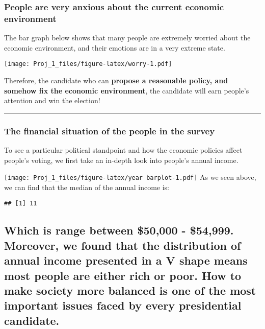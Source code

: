 \documentclass[
]{article}
\begin{document}
\hypertarget{people-are-very-anxious-about-the-current-economic-environment}{%
\subsubsection{People are very anxious about the current economic
environment}\label{people-are-very-anxious-about-the-current-economic-environment}}

The bar graph below shows that many people are extremely worried about
the economic environment, and their emotions are in a very extreme
state.

\texttt{[image: Proj\_1\_files/figure-latex/worry-1.pdf]}

Therefore, the candidate who can \textbf{propose a reasonable policy,
and somehow fix the economic environment}, the candidate will earn
people's attention and win the election!

\begin{center}\rule{0.5\linewidth}{0.5pt}\end{center}

\hypertarget{the-financial-situation-of-the-people-in-the-survey}{%
\subsubsection{The financial situation of the people in the
survey}\label{the-financial-situation-of-the-people-in-the-survey}}

To see a particular political standpoint and how the economic policies
affect people's voting, we first take an in-depth look into people's
annual income.

\texttt{[image: Proj\_1\_files/figure-latex/year barplot-1.pdf]} As we
seen above, we can find that the median of the annual income is:

\begin{verbatim}
## [1] 11
\end{verbatim}

\hypertarget{which-is-range-between-50000---54999.-moreover-we-found-that-the-distribution-of-annual-income-presented-in-a-v-shape-means-most-people-are-either-rich-or-poor.-how-to-make-society-more-balanced-is-one-of-the-most-important-issues-faced-by-every-presidential-candidate.}{%
\subsection{\texorpdfstring{Which is range between \$50,000 - \$54,999.
Moreover, we found that the distribution of annual income presented in a
\textbf{V} shape means most people are either rich or poor. How to make
society more balanced is one of the most important issues faced by every
presidential
candidate.}{Which is range between \$50,000 - \$54,999. Moreover, we found that the distribution of annual income presented in a V shape means most people are either rich or poor. How to make society more balanced is one of the most important issues faced by every presidential candidate.}}\label{which-is-range-between-50000---54999.-moreover-we-found-that-the-distribution-of-annual-income-presented-in-a-v-shape-means-most-people-are-either-rich-or-poor.-how-to-make-society-more-balanced-is-one-of-the-most-important-issues-faced-by-every-presidential-candidate.}}
\end{document}
